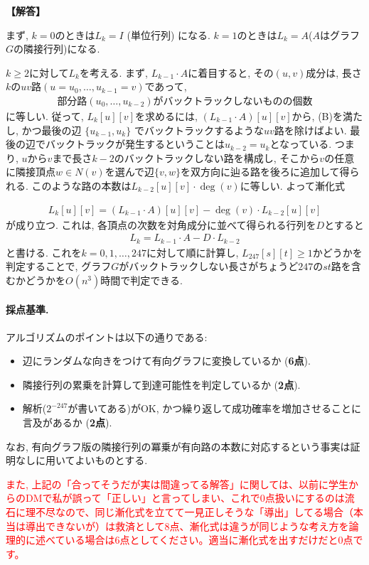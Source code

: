 \documentclass[12pt,a4paper]{article}
\newenvironment{solution}{
    \vspace{0.5em}
    \begin{tcolorbox}[colback=white, colframe=black, boxrule=1pt, arc=0mm, breakable]
    \noindent
    \textbf{【解答】}
    \vspace{0.3em}
}{
    \end{tcolorbox}
    \vspace{1em}
}
\begin{document}
\begin{solution}
  まず, $k=0$のときは$L_k=I$ (単位行列) になる. $k=1$のときは$L_k=A$($A$はグラフ$G$の隣接行列)になる.

  $k\ge 2$に対して$L_{k}$を考える. まず, $L_{k-1}\cdot A$に着目すると, その$(u,v)$成分は,
  長さ$k$の$uv$路$(u=u_0,\dots,u_{k-1}=v)$であって,
  \begin{align*}
    \text{部分路$(u_0,\dots,u_{k-2})$がバックトラックしないものの個数} \tag{B}
  \end{align*}
  に等しい. 従って, $L_{k}[u][v]$を求めるには, $(L_{k-1}\cdot A)[u][v]$から, (B)を満たし, かつ最後の辺 $\{u_{k-1},u_k\}$ でバックトラックするような$uv$路を除けばよい.
  最後の辺でバックトラックが発生するということは$u_{k-2}=u_k$となっている. つまり, $u$から$v$まで長さ$k-2$のバックトラックしない路を構成し, そこから$v$の任意に隣接頂点$w\in N(v)$を選んで辺$\{v,w\}$を双方向に辿る路を後ろに追加して得られる. このような路の本数は$L_{k-2}[u][v]\cdot \deg(v)$に等しい. よって漸化式

  \begin{align*}
    L_{k}[u][v] = (L_{k-1}\cdot A)[u][v] - \deg(v)\cdot L_{k-2}[u][v]
  \end{align*}
  が成り立つ. これは, 各頂点の次数を対角成分に並べて得られる行列を$D$とすると
  \begin{align*}
    L_k = L_{k-1}\cdot A - D\cdot L_{k-2}
  \end{align*}
  と書ける. これを$k=0,1,\dots,247$に対して順に計算し, $L_{247}[s][t]\ge 1$かどうかを判定することで, グラフ$G$がバックトラックしない長さがちょうど$247$の$st$路を含むかどうかを$O(n^3)$時間で判定できる.


  \paragraph*{採点基準.}
  アルゴリズムのポイントは以下の通りである:
  \begin{itemize}
    \item 辺にランダムな向きをつけて有向グラフに変換しているか (\textbf{6点}).
    \item 隣接行列の累乗を計算して到達可能性を判定しているか (\textbf{2点}).
    \item 解析($2^{-247}$が書いてある)がOK, かつ繰り返して成功確率を増加させることに言及があるか (\textbf{2点}).
  \end{itemize}
  なお, 有向グラフ版の隣接行列の冪乗が有向路の本数に対応するという事実は証明なしに用いてよいものとする.

  \textcolor{red}{また, 上記の「合ってそうだが実は間違ってる解答」に関しては、以前に学生からのDMで私が誤って「正しい」と言ってしまい、これで0点扱いにするのは流石に理不尽なので、同じ漸化式を立てて一見正しそうな「導出」してる場合（本当は導出できないが）は救済として8点、漸化式は違うが同じような考え方を論理的に述べている場合は6点としてください。適当に漸化式を出すだけだと0点です。}
\end{solution}
\end{document}
